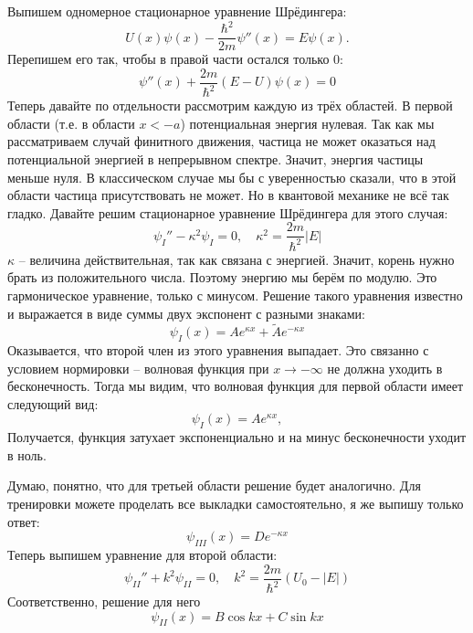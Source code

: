 Выпишем одномерное стационарное уравнение Шрёдингера:
\[
U(x) \psi(x) - \frac{\hbar^2}{2m} \psi''(x) = E \psi(x).
\]
Перепишем его так, чтобы в правой части остался только 0:
\[
\psi''(x) + \frac{2m}{\hbar^2} (E - U) \psi(x) = 0
\]
Теперь давайте по отдельности рассмотрим каждую из трёх областей. В первой области (т.е. в области $x < -a$) потенциальная энергия нулевая. Так как мы рассматриваем случай финитного движения, частица не может оказаться над потенциальной энергией в непрерывном спектре. Значит, энергия частицы меньше нуля. В классическом случае мы бы с уверенностью сказали, что в этой области частица присутствовать не может. Но в квантовой механике не всё так гладко. Давайте решим стационарное уравнение Шрёдингера для этого случая:
\[
\psi_I'' - \kappa^2 \psi_I = 0, \quad \kappa^2 = \frac{2m}{\hbar^2} |E|
\]
$\kappa$ -- величина действительная, так как связана с энергией. Значит, корень нужно брать из положительного числа. Поэтому энергию мы берём по модулю. Это гармоническое уравнение, только с минусом. Решение такого уравнения известно и выражается в виде суммы двух экспонент с разными знаками:
\[
\psi_I (x) = A e^{\kappa x} + \widetilde{A} e^{-\kappa x}
\]
Оказывается, что второй член из этого уравнения выпадает. Это связанно с условием нормировки -- волновая функция при $x \rightarrow -\infty$ не должна уходить в бесконечность. Тогда мы видим, что волновая функция для первой области имеет следующий вид:
\[
\psi_I (x) = A e^{\kappa x},
\]
Получается, функция затухает экспоненциально и на минус бесконечности уходит в ноль.

Думаю, понятно, что для третьей области решение будет аналогично. Для тренировки можете проделать все выкладки самостоятельно, я же выпишу только ответ:
\[
\psi_{III}(x) = D e^{-\kappa x}
\]
Теперь выпишем уравнение для второй области:
\[
\psi_{II}'' + k^2 \psi_{II} = 0, \quad k^2 = \frac{2m}{\hbar^2}(U_0 - |E|)
\]
Соответственно, решение для него
\[
\psi_{II}(x) = B \cos kx + C\sin kx
\]

